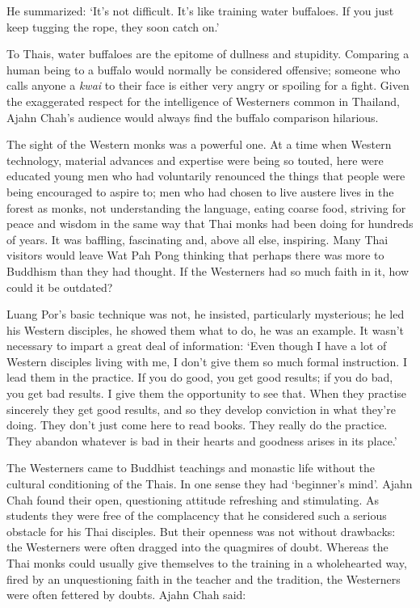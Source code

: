 He summarized: `It's not difficult. It's like training water buffaloes. 
If you just keep tugging the rope, they soon catch on.'

To Thais, water buffaloes are the epitome of dullness and stupidity. 
Comparing a human being to a buffalo would normally be considered
offensive; someone who calls anyone a \emph{kwai} to their face is
either very angry or spoiling for a fight. Given the exaggerated respect
for the intelligence of Westerners common in Thailand, Ajahn Chah's
audience would always find the buffalo comparison hilarious. 

The sight of the Western monks was a powerful one. At a time when
Western technology, material advances and expertise were being so
touted, here were educated young men who had voluntarily renounced the
things that people were being encouraged to aspire to; men who had
chosen to live austere lives in the forest as monks, not understanding
the language, eating coarse food, striving for peace and wisdom in the
same way that Thai monks had been doing for hundreds of years. It was
baffling, fascinating and, above all else, inspiring. Many Thai visitors
would leave Wat Pah Pong thinking that perhaps there was more to
Buddhism than they had thought. If the Westerners had so much faith in
it, how could it be outdated? 

Luang Por's basic technique was not, he insisted, particularly
mysterious; he led his Western disciples, he showed them what to do, he
was an example. It wasn't necessary to impart a great deal of
information: `Even though I have a lot of Western disciples living with
me, I don't give them so much formal instruction. I lead them in the
practice. If you do good, you get good results; if you do bad, you get
bad results. I give them the opportunity to see that. When they practise
sincerely they get good results, and so they develop conviction in what
they're doing. They don't just come here to read books. They really do
the practice. They abandon whatever is bad in their hearts and goodness
arises in its place.'

The Westerners came to Buddhist teachings and monastic life without the
cultural conditioning of the Thais. In one sense they had `beginner's
mind'. Ajahn Chah found their open, questioning attitude refreshing and
stimulating. As students they were free of the complacency that he
considered such a serious obstacle for his Thai disciples. But their
openness was not without drawbacks: the Westerners were often dragged
into the quagmires of doubt. Whereas the Thai monks could usually give
themselves to the training in a wholehearted way, fired by an
unquestioning faith in the teacher and the tradition, the Westerners
were often fettered by doubts. Ajahn Chah said: 

